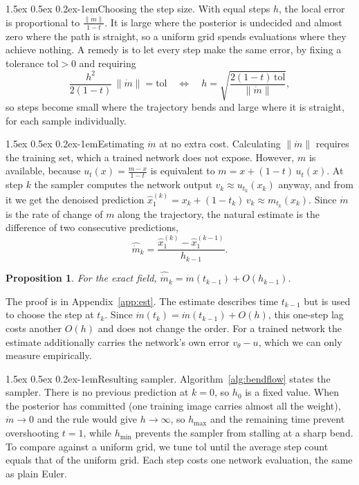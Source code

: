\documentclass{article}
\makeatletter
\renewcommand{\normalsize}{\fontsize{10pt}{11pt}\selectfont}
\renewcommand{\paragraph}{\@startsection{paragraph}{4}{\z@}%
  {1.5ex \@plus 0.5ex \@minus 0.2ex}{-1em}{\normalsize\bfseries}}
\newtheorem{proposition}{Proposition}
\theoremstyle{remark}
\newcommand{\tol}{\mathrm{tol}}
\makeatother
\begin{document}
\paragraph{Choosing the step size.} With equal steps $h$, the local error is proportional to $\frac{\|\dot m\|}{1 - t}$. It is large where the posterior is undecided and almost zero where the path is straight, so a uniform grid spends evaluations where they achieve nothing. A remedy is to let every step make the same error, by fixing a tolerance $\tol > 0$ and requiring
\begin{equation}\label{eq:h}
  \frac{h^2}{2(1 - t)}\,\|\dot m\| = \tol
  \quad\Longleftrightarrow\quad
  h = \sqrt{\frac{2(1 - t)\,\tol}{\|\dot m\|}},
\end{equation}
so steps become small where the trajectory bends and large where it is straight, for each sample individually.

\paragraph{Estimating $\dot m$ at no extra cost.} Calculating $\|\dot m\|$ requires the training set, which a trained network does not expose. However, $m$ is available, because $u_t(x) = \frac{m - x}{1 - t}$ is equivalent to $m = x + (1 - t)\,u_t(x)$. At step $k$ the sampler computes the network output $v_k \approx u_{t_k}(x_k)$ anyway, and from it we get the denoised prediction $\hat x_1^{(k)} = x_k + (1 - t_k)\,v_k \approx m_{t_k}(x_k)$. Since $\dot m$ is the rate of change of $m$ along the trajectory, the natural estimate is the difference of two consecutive predictions,
\begin{equation}\label{eq:est}
  \widehat{\dot m}_k = \frac{\hat x_1^{(k)} - \hat x_1^{(k - 1)}}{h_{k - 1}}.
\end{equation}
\begin{proposition}\label{prop:est}
For the exact field, $\widehat{\dot m}_k = \dot m(t_{k - 1}) + O(h_{k - 1})$.
\end{proposition}
The proof is in Appendix~\ref{app:est}. The estimate describes time $t_{k - 1}$ but is used to choose the step at $t_k$. Since $\dot m(t_k) = \dot m(t_{k - 1}) + O(h)$, this one-step lag costs another $O(h)$ and does not change the order. For a trained network the estimate additionally carries the network's own error $v_\theta - u$, which we can only measure empirically.

\paragraph{Resulting sampler.} Algorithm~\ref{alg:bendflow} states the sampler. There is no previous prediction at $k = 0$, so $h_0$ is a fixed value. When the posterior has committed (one training image carries almost all the weight), $\dot m \to 0$ and the rule would give $h \to \infty$, so $h_{\max}$ and the remaining time prevent overshooting $t = 1$, while $h_{\min}$ prevents the sampler from stalling at a sharp bend. To compare against a uniform grid, we tune $\tol$ until the average step count equals that of the uniform grid. Each step costs one network evaluation, the same as plain Euler.
\end{document}
